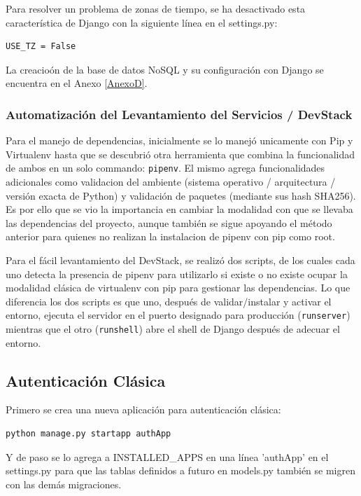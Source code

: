 Para resolver un problema de zonas de tiempo, se ha desactivado esta característica de Django con la siguiente línea en el settings.py:
\lstset{language=Python}
\begin{lstlisting}
USE_TZ = False
\end{lstlisting}
\lstset{language=Bash}

La creacioón de la base de datos NoSQL y su configuración con Django se encuentra en el Anexo \ref{AnexoD}.

\subsubsection{Automatización del Levantamiento del Servicios / DevStack}
Para el manejo de dependencias, inicialmente se lo manejó unicamente con Pip y Virtualenv hasta que se descubrió otra herramienta que combina la funcionalidad de ambos en un solo commando: \texttt{pipenv}. El mismo agrega funcionalidades adicionales como validacion del ambiente (sistema operativo / arquitectura / versión exacta de Python) y validación de paquetes (mediante sus hash SHA256). Es por ello que se vio la importancia en cambiar la modalidad con que se llevaba las dependencias del proyecto, aunque también se sigue apoyando el método anterior para quienes no realizan la instalacion de pipenv con pip como root.

Para el fácil levantamiento del DevStack, se realizó dos scripts, de los cuales cada uno detecta la presencia de pipenv para utilizarlo si existe o no existe ocupar la modalidad clásica de virtualenv con pip para gestionar las dependencias. Lo que diferencia los dos scripts es que uno, después de validar/instalar y activar el entorno, ejecuta el servidor en el puerto designado para producción (\texttt{runserver}) mientras que el otro (\texttt{runshell}) abre el shell de Django después de adecuar el entorno.

\subsection{Autenticación Clásica}

Primero se crea una nueva aplicación para autenticación clásica:
\begin{lstlisting}
python manage.py startapp authApp
\end{lstlisting}

Y de paso se lo agrega a INSTALLED\_APPS en una línea 'authApp' en el settings.py para que las tablas definidos a futuro en models.py también se migren con las demás migraciones.


